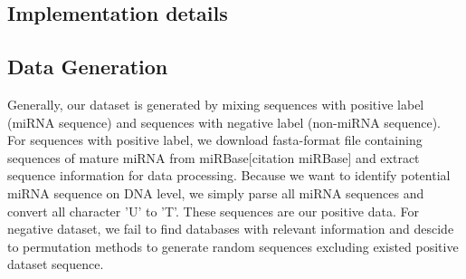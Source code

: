 \documentclass[letterpaper, 11pt]{article}
\begin{document}
\begin{multicols*}{2}
\section{Implementation details}
{
\subsection{Data Generation}
\indent Generally, our dataset is generated by mixing sequences with positive label (miRNA sequence) and sequences with negative label (non-miRNA sequence). For sequences with positive label, we download fasta-format file containing sequences of mature miRNA from miRBase[citation miRBase] and extract sequence information for data processing. Because we want to identify potential miRNA sequence on DNA level, we simply parse all miRNA sequences and convert all character 'U' to 'T'. These sequences are our positive data. For negative dataset, we fail to find databases with relevant information and descide to permutation methods to generate random sequences excluding existed positive dataset sequence.

}
\end{multicols*}
\end{document}
